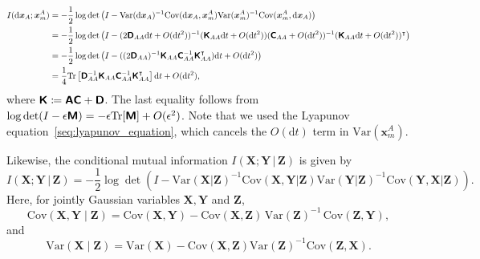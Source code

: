\begin{equation*}
\begin{aligned}
    I(\mathrm d\bm x_A;\bm x_m^A)
    &=-\frac{1}{2}\log\det\left(
    I-\mathrm{Var}(\mathrm d\bm x_A)^{-1}
    \mathrm{Cov}(\mathrm d\bm x_A,\bm x_m^A)
    \mathrm{Var}(\bm x_m^A)^{-1}
    \mathrm{Cov}(\bm x_m^A,\mathrm d\bm x_A)
    \right)\\
    &=-\frac{1}{2}\log\det\left(
    I-(2\boldsymbol{\mathsf{D}}_{AA}\mathrm{d}t+O(\mathrm{d}t^2))^{-1}
    (\boldsymbol{\mathsf{K}}_{AA}\mathrm{d}t+O(\mathrm{d}t^2))
    (\boldsymbol{\mathsf{C}}_{AA}+O(\mathrm{d}t^2))^{-1}
    (\boldsymbol{\mathsf{K}}_{AA}\mathrm{d}t+O(\mathrm{d}t^2))^\intercal
    \right)\\
    &=-\frac{1}{2}\log\det\left(
    I-((2\boldsymbol{\mathsf{D}}_{AA})^{-1}\boldsymbol{\mathsf{K}}_{AA}\boldsymbol{\mathsf{C}}_{AA}^{-1}\boldsymbol{\mathsf{K}}_{AA}^\intercal)\mathrm{d}t+O(\mathrm{d}t^2)
    \right)\\
    &=\frac{1}{4}\mathrm{Tr}\left[
    \boldsymbol{\mathsf{D}}_{AA}^{-1}\boldsymbol{\mathsf{K}}_{AA}\boldsymbol{\mathsf{C}}_{AA}^{-1}\boldsymbol{\mathsf{K}}_{AA}^\intercal\right]\mathrm{d}t+O(\mathrm{d}t^2),
\end{aligned}
\end{equation*}
where $\boldsymbol{\mathsf{K}}\coloneq\boldsymbol{\mathsf{A}}\boldsymbol{\mathsf{C}}+\boldsymbol{\mathsf{D}}$. 
The last equality follows from $\log\det(I-\epsilon\boldsymbol{\mathsf{M}})=-\epsilon\mathrm{Tr}[\boldsymbol{\mathsf{M}}]+O(\epsilon^2)$.
Note that we used the Lyapunov equation~\eqref{seq:lyapunov_equation}, which cancels the $O(\mathrm dt)$ term in $\mathrm{Var}(\bm x_m^A)$.

Likewise, the conditional mutual information $I(\bm X;\bm Y\,|\,\bm Z)$ is given by
\[
    I(\bm X;\bm Y\,|\,\bm Z)
    =-\frac{1}{2}\log\det\left(
    I-\mathrm{Var}(\bm X|\bm Z)^{-1}
    \mathrm{Cov}(\bm X, \bm Y|\bm Z)
    \mathrm{Var}(\bm Y|\bm Z)^{-1}
    \mathrm{Cov}(\bm Y,\bm X|\bm Z)
    \right).
\]
Here, for jointly Gaussian variables $\bm X,\bm Y$ and $\bm Z$,
\[
    \mathrm{Cov}(\bm X,\bm Y \mid \bm Z)
    =\mathrm{Cov}(\bm X,\bm Y)
    -\mathrm{Cov}(\bm X,\bm Z)\,\mathrm{Var}(\bm Z)^{-1}\,\mathrm{Cov}(\bm Z,\bm Y),
\]
and
\[
    \mathrm{Var}(\bm X\mid\bm Z)
    =\mathrm{Var}(\bm X)-\mathrm{Cov}(\bm X,\bm Z)\mathrm{Var}(\bm Z)^{-1}\mathrm{Cov}(\bm Z,\bm X).
\]

